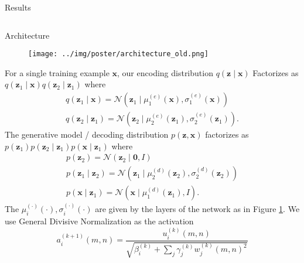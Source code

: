 \documentclass[final]{beamer}
\newlength{\onecolwid}
\newlength{\twocolwid}
\renewcommand{\vec}[1]{\mathbf{#1}}
\newcommand{\N}{\mathcal{N}}
\begin{document}
\begin{frame}[t]
\begin{columns}[t]
\begin{column}{\twocolwid}
\begin{block}{Results}
\end{block}


\begin{columns}[t,totalwidth=\twocolwid] %

\begin{column}{\onecolwid} %


\begin{block}{Architecture}
  \begin{figure}[H]
    \centering
    \texttt{[image: ../img/poster/architecture\_old.png]}
    \label{fig:architecture}
  \end{figure}

  \noindent
  For a single training example $\vec{x}$, our encoding distribution $q(\vec{z} \mid \vec{x})$
  Factorizes as $q(\vec{z}_1 \mid \vec{x})q(\vec{z}_2 \mid \vec{z}_1)$ where
  \begin{gather*}
    q(\vec{z}_1 \mid \vec{x}) = \N(\vec{z}_1 \mid \mu^{(e)}_1(\vec{x}),
    \sigma^{(e)}_1(\vec{x})) \\
    q(\vec{z}_2 \mid \vec{z}_1) = \N(\vec{z}_2 \mid \mu^{(e)}_2(\vec{z}_1),
    \sigma^{(e)}_2(\vec{z}_1)).
  \end{gather*}
  The generative model / decoding distribution $p(\vec{z},
  \vec{x})$ factorizes as $p(\vec{z}_1)p(\vec{z}_2\mid \vec{z}_1)p(\vec{x} \mid
  \vec{z}_1)$ where
  \begin{gather*}
    p(\vec{z}_2) = \N(\vec{z}_2 \mid \vec{0}, I) \\
    p(\vec{z}_1 \mid \vec{z}_2) = \N(\vec{z}_1 \mid \mu^{(d)}_2(\vec{z}_2),
    \sigma^{(d)}_2(\vec{z}_2)) \\ 
    p(\vec{x} \mid \vec{z}_1) = \N(\vec{x} \mid \mu^{(d)}_1(\vec{z}_1), I). 
  \end{gather*}
  The $\mu^{(\cdot)}_i(\cdot), \sigma^{(\cdot)}_i(\cdot)$ are given by the layers
  of the network as in Figure \ref{fig:architecture}.
  We use General Divisive Normalization \cite{balle2016end} as the activation
\begin{equation}
  a^{(k + 1)}_i(m, n) = \frac{u^{(k)}_i(m, n)}{\sqrt{\beta^{(k)}_i + \sum_j \gamma^{(k)}_jw^{(k)}_j(m, n)^2}}
\end{equation}


\end{block}
\end{column}
\end{columns}
\end{column}
\end{columns}
\end{frame}
\end{document}
